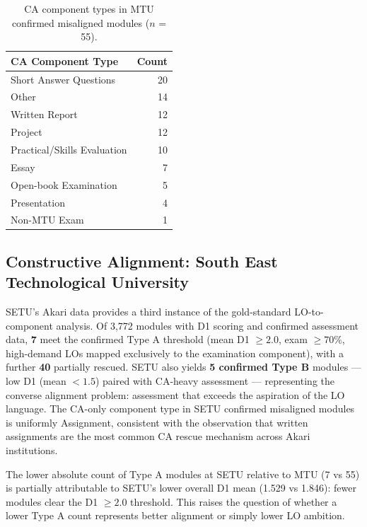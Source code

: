 \documentclass[12pt, a4paper]{article}
\begin{document}
\begin{table}[H]
\centering
\caption{CA component types in MTU confirmed misaligned modules ($n$ = 55).}
\label{tab:catypes}
\begin{tabular}{lr}
\toprule
\textbf{CA Component Type} & \textbf{Count} \\
\midrule
Short Answer Questions     & 20 \\
Other                      & 14 \\
Written Report             & 12 \\
Project                    & 12 \\
Practical/Skills Evaluation & 10 \\
Essay                      &  7 \\
Open-book Examination      &  5 \\
Presentation               &  4 \\
Non-MTU Exam               &  1 \\
\bottomrule
\end{tabular}
\end{table}

\subsection{Constructive Alignment: South East Technological University}

SETU's Akari data provides a third instance of the gold-standard LO-to-component
analysis. Of 3,772 modules with D1 scoring and confirmed assessment data, \textbf{7}
meet the confirmed Type A threshold (mean D1 $\geq 2.0$, exam $\geq 70\%$, high-demand
LOs mapped exclusively to the examination component), with a further \textbf{40}
partially rescued. SETU also yields \textbf{5 confirmed Type B} modules --- low D1
(mean $< 1.5$) paired with CA-heavy assessment --- representing the converse alignment
problem: assessment that exceeds the aspiration of the LO language. The CA-only
component type in SETU confirmed misaligned modules is uniformly Assignment,
consistent with the observation that written assignments are the most common CA
rescue mechanism across Akari institutions.

The lower absolute count of Type A modules at SETU relative to MTU (7 vs 55) is
partially attributable to SETU's lower overall D1 mean (1.529 vs 1.846): fewer modules
clear the D1 $\geq 2.0$ threshold. This raises the question of whether a lower
Type A count represents better alignment or simply lower LO ambition.
\end{document}

